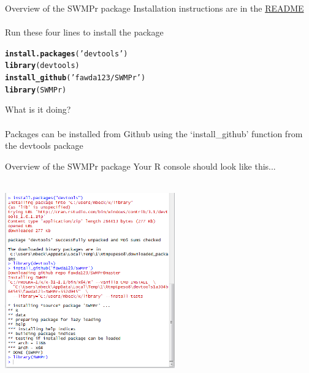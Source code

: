 \documentclass[xcolor=svgnames]{beamer}\usepackage[]{graphicx}\usepackage[]{color}
\makeatletter
\newcommand{\hlstr}[1]{\textcolor[rgb]{0.192,0.494,0.8}{#1}}%
\newcommand{\hlstd}[1]{\textcolor[rgb]{0.345,0.345,0.345}{#1}}%
\newcommand{\hlkwd}[1]{\textcolor[rgb]{0.737,0.353,0.396}{\textbf{#1}}}%
\newenvironment{kframe}{%
 \def\at@end@of@kframe{}%
 \ifinner\ifhmode%
  \def\at@end@of@kframe{\end{minipage}}%
  \begin{minipage}{\columnwidth}%
 \fi\fi%
 \def\FrameCommand##1{\hskip\@totalleftmargin \hskip-\fboxsep
 \colorbox{shadecolor}{##1}\hskip-\fboxsep
     \hskip-\linewidth \hskip-\@totalleftmargin \hskip\columnwidth}%
 \MakeFramed {\advance\hsize-\width
   \@totalleftmargin\z@ \linewidth\hsize
   \@setminipage}}%
 {\par\unskip\endMakeFramed%
 \at@end@of@kframe}
\newenvironment{knitrout}{}{} %
\makeatother
\begin{document}
\begin{frame}[t, fragile]{Overview of the SWMPr package}
Installation instructions are in the \href{https://github.com/fawda123/SWMPr/blob/master/README.md}{README} \\~\\
Run these four lines to install the package
\begin{knitrout}\scriptsize
{}\color{fgcolor}\begin{kframe}
\begin{alltt}
\hlkwd{install.packages}\hlstd{(}\hlstr{'devtools'}\hlstd{)}
\hlkwd{library}\hlstd{(devtools)}
\hlkwd{install_github}\hlstd{(}\hlstr{'fawda123/SWMPr'}\hlstd{)}
\hlkwd{library}\hlstd{(SWMPr)}
\end{alltt}
\end{kframe}
\end{knitrout}
What is it doing? \\~\\
Packages can be installed from Github using the `install\_github' function from the devtools package
\end{frame}

\begin{frame}[t, fragile]{Overview of the SWMPr package}
Your R console should look like this...\\~\\
\centerline{\includegraphics[width = 0.55\textwidth]{swmpr_install.png}}
\end{frame}
\end{document}
